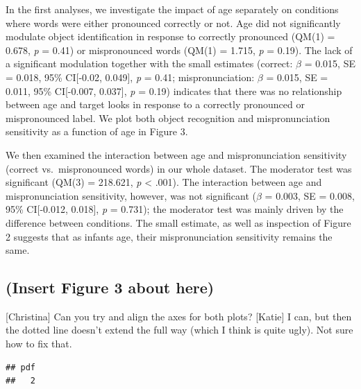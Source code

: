 \documentclass[man]{apa6}
\theoremstyle{definition}
\theoremstyle{definition}
\theoremstyle{definition}
\theoremstyle{remark}
\begin{document}
In the first analyses, we investigate the impact of age separately on
conditions where words were either pronounced correctly or not. Age did
not significantly modulate object identification in response to
correctly pronounced (QM(1) = 0.678, \emph{p} = 0.41) or mispronounced
words (QM(1) = 1.715, \emph{p} = 0.19). The lack of a significant
modulation together with the small estimates (correct: \(\beta\) =
0.015, SE = 0.018, 95\% CI{[}-0.02, 0.049{]}, \emph{p} = 0.41;
mispronunciation: \(\beta\) = 0.015, SE = 0.011, 95\% CI{[}-0.007,
0.037{]}, \emph{p} = 0.19) indicates that there was no relationship
between age and target looks in response to a correctly pronounced or
mispronounced label. We plot both object recognition and
mispronunciation sensitivity as a function of age in Figure 3.

We then examined the interaction between age and mispronunciation
sensitivity (correct vs.~mispronounced words) in our whole dataset. The
moderator test was significant (QM(3) = 218.621, \emph{p} \textless{}
.001). The interaction between age and mispronunciation sensitivity,
however, was not significant (\(\beta\) = 0.003, SE = 0.008, 95\%
CI{[}-0.012, 0.018{]}, \emph{p} = 0.731); the moderator test was mainly
driven by the difference between conditions. The small estimate, as well
as inspection of Figure 2 suggests that as infants age, their
mispronunciation sensitivity remains the same.

\subsection{(Insert Figure 3 about
here)}\label{insert-figure-3-about-here}

{[}Christina{]} Can you try and align the axes for both plots?
{[}Katie{]} I can, but then the dotted line doesn't extend the full way
(which I think is quite ugly). Not sure how to fix that.

\begin{verbatim}
## pdf 
##   2
\end{verbatim}
\end{document}
